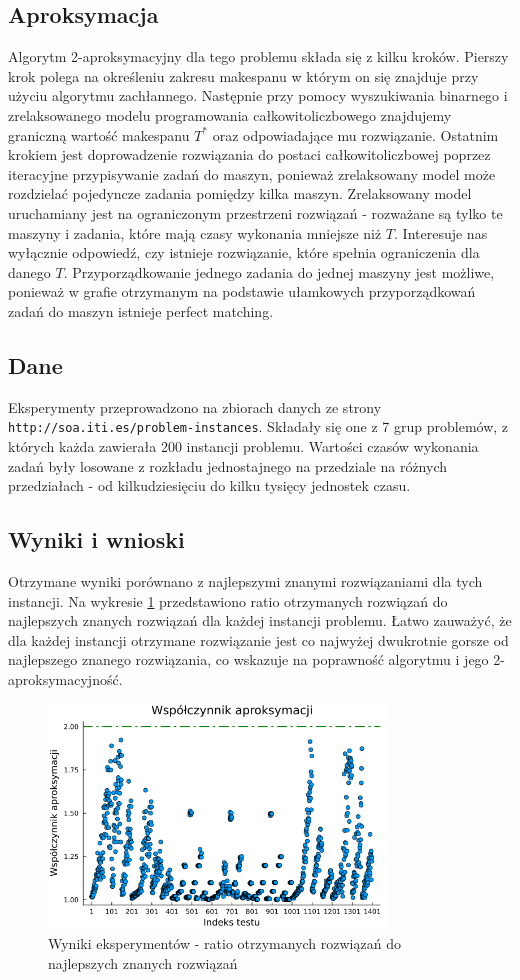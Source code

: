 \documentclass{article}
\begin{document}
\subsection{Aproksymacja}
Algorytm 2-aproksymacyjny dla tego problemu składa się z kilku kroków. Pierszy krok polega na określeniu zakresu makespanu w którym on się znajduje przy użyciu algorytmu zachłannego. 
Następnie przy pomocy wyszukiwania binarnego i zrelaksowanego modelu programowania całkowitoliczbowego znajdujemy graniczną wartość makespanu $T^*$ oraz odpowiadające mu rozwiązanie.
Ostatnim krokiem jest doprowadzenie rozwiązania do postaci całkowitoliczbowej poprzez iteracyjne przypisywanie zadań do maszyn, ponieważ zrelaksowany model może rozdzielać pojedyncze zadania pomiędzy kilka maszyn.
Zrelaksowany model uruchamiany jest na ograniczonym przestrzeni rozwiązań - rozważane są tylko te maszyny i zadania, które mają czasy wykonania mniejsze niż $T$. Interesuje nas wyłącznie odpowiedź, czy istnieje rozwiązanie, które spełnia ograniczenia dla danego $T$.
Przyporządkowanie jednego zadania do jednej maszyny jest możliwe, ponieważ w grafie otrzymanym na podstawie ułamkowych przyporządkowań zadań do maszyn istnieje perfect matching.

\subsection{Dane}
Eksperymenty przeprowadzono na zbiorach danych ze strony \texttt{http://soa.iti.es/problem-instances}. Składały się one z 7 grup problemów, z których każda zawierała 200 instancji problemu.
Wartości czasów wykonania zadań były losowane z rozkładu jednostajnego na przedziale na różnych przedziałach - od kilkudziesięciu do kilku tysięcy jednostek czasu.

\subsection{Wyniki i wnioski}
Otrzymane wyniki porównano z najlepszymi znanymi rozwiązaniami dla tych instancji. 
Na wykresie \ref{fig:results} przedstawiono ratio otrzymanych rozwiązań do najlepszych znanych rozwiązań dla każdej instancji problemu.
Łatwo zauważyć, że dla każdej instancji otrzymane rozwiązanie jest co najwyżej dwukrotnie gorsze od najlepszego znanego rozwiązania, co wskazuje na poprawność algorytmu i jego 2-aproksymacyjność.

\begin{figure}[ht]
    \centering
    \includegraphics[width=0.8\textwidth]{../approximation_ratio_plot.png}
    \caption{Wyniki eksperymentów - ratio otrzymanych rozwiązań do najlepszych znanych rozwiązań}
    \label{fig:results}
\end{figure}
\end{document}

